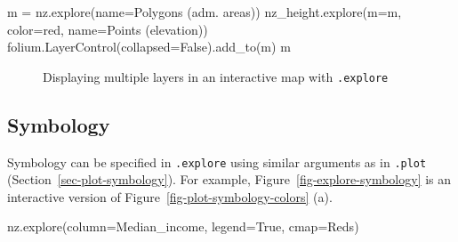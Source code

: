 \documentclass[
  letterpaper,
]{krantz}
\newenvironment{Shaded}{\begin{snugshade}}{\end{snugshade}}
\newcommand{\NormalTok}[1]{\textcolor[rgb]{0.00,0.23,0.31}{#1}}
\newcommand{\OperatorTok}[1]{\textcolor[rgb]{0.37,0.37,0.37}{#1}}
\newcommand{\StringTok}[1]{\textcolor[rgb]{0.13,0.47,0.30}{#1}}
\newcommand{\VariableTok}[1]{\textcolor[rgb]{0.07,0.07,0.07}{#1}}
\begin{document}
\begin{Shaded}
\begin{Highlighting}[]
\NormalTok{m }\OperatorTok{=}\NormalTok{ nz.explore(name}\OperatorTok{=}\StringTok{\textquotesingle{}Polygons (adm. areas)\textquotesingle{}}\NormalTok{)}
\NormalTok{nz\_height.explore(m}\OperatorTok{=}\NormalTok{m, color}\OperatorTok{=}\StringTok{\textquotesingle{}red\textquotesingle{}}\NormalTok{, name}\OperatorTok{=}\StringTok{\textquotesingle{}Points (elevation)\textquotesingle{}}\NormalTok{)}
\NormalTok{folium.LayerControl(collapsed}\OperatorTok{=}\VariableTok{False}\NormalTok{).add\_to(m)}
\NormalTok{m}
\end{Highlighting}
\end{Shaded}

\begin{figure}


\caption{\label{fig-explore-layers-controls}Displaying multiple layers
in an interactive map with \texttt{.explore}}

\end{figure}%

\subsection{Symbology}\label{sec-explore-symbology}

Symbology can be specified in \texttt{.explore} using similar arguments
as in \texttt{.plot} (Section~\ref{sec-plot-symbology}). For example,
Figure~\ref{fig-explore-symbology} is an interactive version of
Figure~\ref{fig-plot-symbology-colors} (a).

\begin{Shaded}
\begin{Highlighting}[]
\NormalTok{nz.explore(column}\OperatorTok{=}\StringTok{\textquotesingle{}Median\_income\textquotesingle{}}\NormalTok{, legend}\OperatorTok{=}\VariableTok{True}\NormalTok{, cmap}\OperatorTok{=}\StringTok{\textquotesingle{}Reds\textquotesingle{}}\NormalTok{)}
\end{Highlighting}
\end{Shaded}
\end{document}
